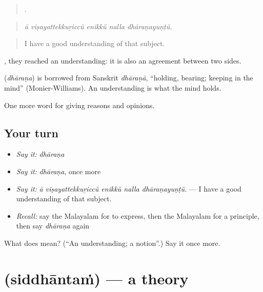\begin{quote}
    .
\end{quote}

\begin{quote}
\emph{ā viṣayattekkuṟiccŭ enikkŭ nalla dhāraṇayuṇṭŭ.}
\end{quote}

\begin{quote}
I have a good understanding of that subject.
\end{quote}

  , they reached an understanding: it is also an agreement between two sides.

\begin{cousinweb}
\textbf{} (\emph{dhāraṇa}) is borrowed from Sanskrit \emph{dhāraṇā}, \textquotedblleft{}holding, bearing; keeping in the mind\textquotedblright{} (Monier-Williams). An understanding is what the mind holds.
\end{cousinweb}

\begin{grammarlens}[title={What you've built}]
One more word for giving reasons and opinions.
\end{grammarlens}

\subsection*{Your turn}
\begin{itemize}
\raggedright
  \item \emph{Say it:} \emph{dhāraṇa}
  \item \emph{Say it:} \emph{dhāraṇa}, once more
  \item \emph{Say it:} \emph{ā viṣayattekkuṟiccŭ enikkŭ nalla dhāraṇayuṇṭŭ.} — I have a good understanding of that subject.
  \item \emph{Recall:} say the Malayalam for to express, then the Malayalam for a principle, then say \emph{dhāraṇa} again
\end{itemize}

\begin{tcolorbox}[breakable,colback=teal!4,colframe=teal!35!black,title={Before you move on}]
What does  mean? (\textquotedblleft{}An understanding; a notion\textquotedblright{}.) Say it once more.
\end{tcolorbox}
\section[\texorpdfstring{\ml{സിദ്ധാന്തം} (siddhāntaṁ)}{സിദ്ധാന്തം (siddhāntaṁ)}]{ (siddhāntaṁ) — a theory}

